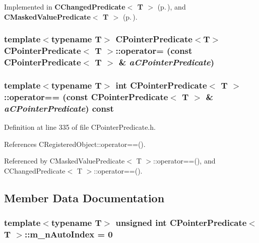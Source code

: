 Implemented in {\bf CChanged\-Predicate$<$ T $>$} {\rm (p.\,\pageref{classCChangedPredicate_a6})}, and {\bf CMasked\-Value\-Predicate$<$ T $>$} {\rm (p.\,\pageref{classCMaskedValuePredicate_a7})}.
\subsubsection{\setlength{\rightskip}{0pt plus 5cm}template$<$typename T$>$ CPointer\-Predicate$<$T$>$ CPointer\-Predicate$<$ T $>$::operator= (const CPointer\-Predicate$<$ T $>$ \& {\em a\-CPointer\-Predicate})\hspace{0.3cm}{\tt  [private]}}\label{classCPointerPredicate_c1}


\subsubsection{\setlength{\rightskip}{0pt plus 5cm}template$<$typename T$>$ int CPointer\-Predicate$<$ T $>$::operator== (const CPointer\-Predicate$<$ T $>$ \& {\em a\-CPointer\-Predicate}) const\hspace{0.3cm}{\tt  [inline]}}\label{classCPointerPredicate_a4}




Definition at line 335 of file CPointer\-Predicate.h.

References CRegistered\-Object::operator==().

Referenced by CMasked\-Value\-Predicate$<$ T $>$::operator==(), and CChanged\-Predicate$<$ T $>$::operator==().

\subsection{Member Data Documentation}
\subsubsection{\setlength{\rightskip}{0pt plus 5cm}template$<$typename T$>$ unsigned int CPointer\-Predicate$<$ T $>$::m\_\-n\-Auto\-Index = 0\hspace{0.3cm}{\tt  [static, private]}}\label{classCPointerPredicate_r0}


